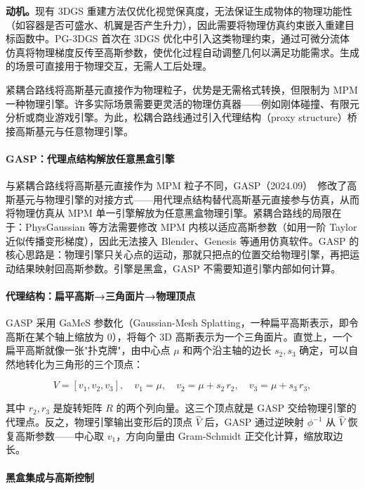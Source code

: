\textbf{动机。}现有 3DGS 重建方法仅优化视觉保真度，无法保证生成物体的物理功能性（如容器是否可盛水、机翼是否产生升力），因此需要将物理仿真约束嵌入重建目标函数中。PG-3DGS 首次在 3DGS 优化中引入这类物理约束，通过可微分流体仿真将物理梯度反传至高斯参数，使优化过程自动调整几何以满足功能需求。生成的场景可直接用于物理交互，无需人工后处理。

紧耦合路线将高斯基元直接作为物理粒子，优势是无需格式转换，但限制为 MPM 一种物理引擎。许多实际场景需要更灵活的物理仿真器——例如刚体碰撞、有限元分析或商业游戏引擎。为此，松耦合路线通过引入代理结构（proxy structure）桥接高斯基元与任意物理引擎。

\paragraph{GASP：代理点结构解放任意黑盒引擎}

与紧耦合路线将高斯基元直接作为 MPM 粒子不同，GASP（2024.09）~\cite{2409_05819}修改了高斯基元与物理引擎的对接方式——用代理点结构替代高斯基元直接参与仿真，从而将物理仿真从 MPM 单一引擎解放为任意黑盒物理引擎。紧耦合路线的局限在于：PhysGaussian 等方法需要修改 MPM 内核以适应高斯参数（如用一阶 Taylor 近似传播变形梯度），因此无法接入 Blender、Genesis 等通用仿真软件。GASP 的核心思路是：物理引擎只关心点的运动，那就只把点的位置交给物理引擎，再把运动结果映射回高斯参数。引擎是黑盒，GASP 不需要知道引擎内部如何计算。

\paragraph*{代理结构：扁平高斯→三角面片→物理顶点}

GASP 采用 GaMeS 参数化（Gaussian-Mesh Splatting，一种扁平高斯表示，即令高斯在某个轴上缩放为 0），将每个 3D 高斯表示为一个三角面片。直觉上，一个扁平高斯就像一张"扑克牌"，由中心点 $\mu$ 和两个沿主轴的边长 $s_2, s_3$ 确定，可以自然地转化为三角形的三个顶点：

\begin{equation}
V = [v_1, v_2, v_3], \quad v_1 = \mu, \quad v_2 = \mu + s_2 \, r_2, \quad v_3 = \mu + s_3 \, r_3,
\end{equation}

其中 $r_2, r_3$ 是旋转矩阵 $R$ 的两个列向量。这三个顶点就是 GASP 交给物理引擎的代理点。反之，物理引擎输出变形后的顶点 $\hat{V}$ 后，GASP 通过逆映射 $\phi^{-1}$ 从 $\hat{V}$ 恢复高斯参数——中心取 $v_1$，方向向量由 Gram-Schmidt 正交化计算，缩放取边长。

\paragraph*{黑盒集成与高斯控制}


